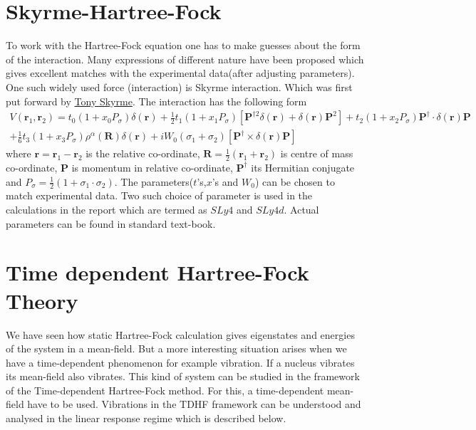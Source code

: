 \documentclass[a4paper]{paper}
\begin{document}
        \section{Skyrme-Hartree-Fock}
            To work with the Hartree-Fock equation one has to make guesses about the form of the interaction. Many expressions of different nature have been proposed which gives excellent matches with the experimental data(after adjusting parameters). One such widely used force (interaction) is Skyrme interaction. Which was first put forward by \href{https://en.wikipedia.org/wiki/Tony_Skyrme}{Tony Skyrme}.
            The interaction has the following form
            \begin{equation}
                \begin{split}
                    V(\mathbf{r}_1,\mathbf{r}_2) = t_0(1 + x_0 P_{\sigma})\delta(\mathbf{r}) +\frac{1}{2}t_1(1 + x_1 P_{\sigma})\left[\mathbf{P}^{\dagger2} \delta(\mathbf{r}) + \delta(\mathbf{r}) \mathbf{P}^2 \right] + t_2(1 + x_2 P_\sigma)\mathbf{P}^{\dagger} \cdot \delta(\mathbf{r}) \mathbf{P} \\+  \frac{1}{6}t_3 (1 + x_3 P_\sigma)\rho^{\alpha} ( \mathbf{R} )\delta(\mathbf{r}) + i W_0(\sigma_1 + \sigma_2) \left[ \mathbf{P}^{\dagger} \times \delta(\mathbf{r})\mathbf{P}\right]
                \end{split}
            \end{equation}
            where $\mathbf{r} =\mathbf{r}_1 - \mathbf{r}_2$ is the relative co-ordinate, $\mathbf{R} = \frac{1}{2}(\mathbf{r}_1 + \mathbf{r}_2)$ is centre of mass co-ordinate, $\mathbf{P}$ is momentum in relative co-ordinate, $\mathbf{P}^{\dagger}$ its Hermitian conjugate and $P_{\sigma} = \frac{1}{2}(1+\sigma_1\cdot\sigma_2)$. The parameters($t$'s,$x$'s and $W_0$) can be chosen to match experimental data. Two such choice of parameter is used in the calculations in the report which are termed as $SLy4$ and $SLy4d$. Actual parameters can be found in standard text-book. 
        \section{Time dependent Hartree-Fock Theory}
            We have seen how static Hartree-Fock calculation gives eigenstates and energies of the system in a mean-field. But a more interesting situation arises when we have a time-dependent phenomenon for example vibration. If a nucleus vibrates its mean-field also vibrates. This kind of system can be studied in the framework of the Time-dependent Hartree-Fock method. For this, a time-dependent mean-field have to be used. Vibrations in the TDHF framework can be understood and analysed in the linear response regime which is described below. 
\end{document}
